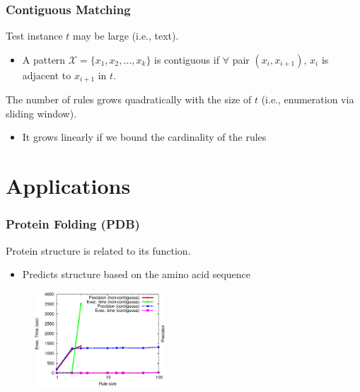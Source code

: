 \documentclass{beamer}
\begin{document}
\begin{frame}\frametitle{Contiguous Matching}

Test instance $t$ may be large (i.e., text).

\begin{itemize}
\item A pattern $\mathcal{X}=\{x_1, x_2, \ldots, x_k\}$ is contiguous if $\forall$ pair
$(x_i, x_{i+1})$,
$x_i$ is adjacent to $x_{i+1}$ in $t$.
\end{itemize}

The number of rules grows quadratically with the size of $t$ (i.e., enumeration via sliding window).

\begin{itemize} 
\item \alert{It grows linearly if we bound the cardinality of the rules}
\end{itemize} 

\end{frame}

\section{Applications}

\begin{frame}\frametitle{Protein Folding (PDB)}

Protein structure is related to its function.

\begin{itemize}
\item Predicts structure based on the amino acid sequence
\end{itemize}

\begin{figure}
\centering
\includegraphics[height=1.40in]{tt.eps}
\end{figure}


\end{frame}
\end{document}
